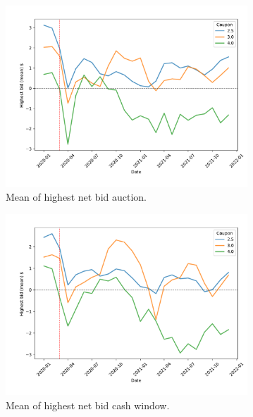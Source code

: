\documentclass[11pt,a4paper]{article}
\begin{document}
\begin{figure}[h]
\begin{subfigure}[b]{0.49\textwidth}
      \includegraphics[width=0.998\textwidth]{../results/figures/winner_bid_mean_mat30_loan1_timeseries_cpmonthly_2.5_4_auction_netbid.pdf}
      \caption{ Mean of highest net bid auction.}
     \end{subfigure}
     \begin{subfigure}[b]{0.49\textwidth}
      \includegraphics[width=0.998\textwidth]{../results/figures/winner_bid_mean_mat30_loan1_timeseries_cpmonthly_2.5_4_cash_window_netbid.pdf}
      \caption{ Mean of highest net bid cash window.}
     \end{subfigure}
     \begin{subfigure}[b]{0.49\textwidth}

\end{subfigure}
\end{figure}
\end{document}
